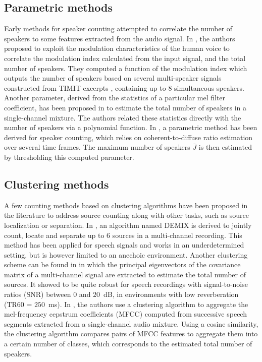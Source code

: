 \subsection{Parametric methods}

Early methods for speaker counting attempted to correlate the number of speakers to some features extracted from the audio signal. In \cite{arai_estimating_2003}, the authors proposed to exploit the modulation characteristics of the human voice to correlate the modulation index calculated from the input signal, and the total number of speakers. They computed a function of the modulation index which outputs the number of speakers based on several multi-speaker signals constructed from TIMIT excerpts \cite{garofolo_timit_1993}, containing up to 8 simultaneous speakers. Another parameter, derived from the statistics of a particular mel filter coefficient, has been proposed in \cite{sayoud_proposal_2010} to estimate the total number of speakers in a single-channel mixture. The authors related these statistics directly with the number of speakers via a polynomial function. In \cite{pasha_towards_2017}, a parametric method has been derived for speaker counting, which relies on coherent-to-diffuse ratio estimation over several time frames. The maximum number of speakers $\bar{J}$ is then estimated by thresholding this computed parameter.

\subsection{Clustering methods}

A few counting methods based on clustering algorithms have been proposed in the literature to address source counting along with other tasks, such as source localization or separation. In \cite{arberet_robust_2010}, an algorithm named DEMIX is derived to jointly count, locate and separate up to 6 sources in a multi-channel recording. This method has been applied for speech signals and works in an underdetermined setting, but is however limited to an anechoic environment. Another clustering scheme can be found in \cite{yang_multiple_2017} in which the principal eigenvectors of the covariance matrix of a multi-channel signal are extracted to estimate the total number of sources. It showed to be quite robust for speech recordings with signal-to-noise ratios (SNR) between $0$ and $20$~dB, in environments with low reverberation (TR60 = $250$~ms). In \cite{xu_crowd++:_2013}, the authors use a clustering algorithm to aggregate the mel-frequency cepstrum coefficients (MFCC) computed from successive speech segments extracted from a single-channel audio mixture. Using a cosine similarity, the clustering algorithm compares pairs of MFCC features to aggregate them into a certain number of classes, which corresponds to the estimated total number of speakers.


